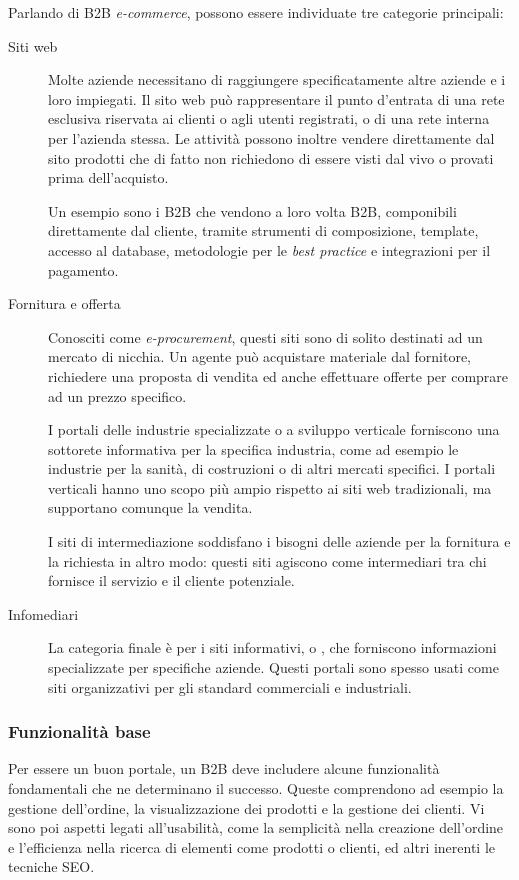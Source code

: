 Parlando di B2B \textit{e-commerce}, possono essere individuate tre categorie principali:
\begin{description}
	\item[Siti web] Molte aziende necessitano di raggiungere specificatamente altre aziende e i loro impiegati. Il sito web può rappresentare il punto d'entrata di una rete esclusiva riservata ai clienti o agli utenti registrati, o di una rete interna per l'azienda stessa. Le attività possono inoltre vendere direttamente dal sito prodotti che di fatto non richiedono di essere visti dal vivo o provati prima dell'acquisto.
	
	Un esempio sono i B2B che vendono a loro volta B2B, componibili direttamente dal cliente, tramite strumenti di composizione, template, accesso al database, metodologie per le \textit{best practice} e integrazioni per il pagamento.
	
	\item[Fornitura e offerta] Conosciti come \textit{e-procurement}, questi siti sono di solito destinati ad un mercato di nicchia. Un agente può acquistare materiale dal fornitore, richiedere una proposta di vendita ed anche effettuare offerte per comprare ad un prezzo specifico.
	
	I portali delle industrie specializzate o a sviluppo verticale forniscono una sottorete informativa per la specifica industria, come ad esempio le industrie per la sanità, di costruzioni o di altri mercati specifici.
	I portali verticali hanno uno scopo più ampio rispetto ai siti web tradizionali, ma supportano comunque la vendita.
	
	I siti di intermediazione soddisfano i bisogni delle aziende per la fornitura e la richiesta in altro modo: questi siti agiscono come intermediari tra chi fornisce il servizio e il cliente potenziale.
	
	\item[Infomediari] La categoria finale è per i siti informativi, o , che forniscono informazioni specializzate per specifiche aziende. Questi portali sono spesso usati come siti organizzativi per gli standard commerciali e industriali.
\end{description}

\subsubsection{Funzionalità base}
Per essere un buon portale, un B2B deve includere alcune funzionalità fondamentali che ne determinano il successo. Queste comprendono ad esempio la gestione dell'ordine, la visualizzazione dei prodotti e la gestione dei clienti. Vi sono poi aspetti legati all'usabilità, come la semplicità nella creazione dell'ordine e l'efficienza nella ricerca di elementi come prodotti o clienti, ed altri inerenti le tecniche SEO.

